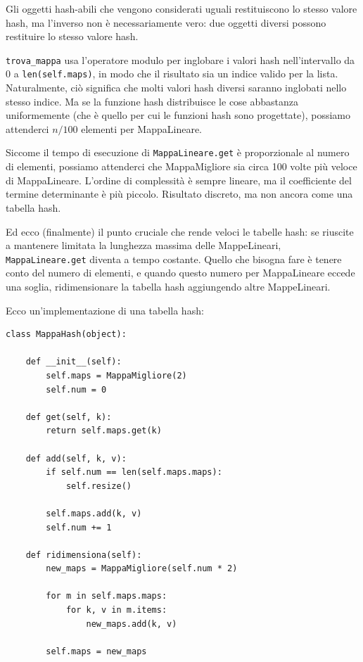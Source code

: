 \documentclass[10pt]{book}
\begin{document}
Gli oggetti hash-abili che vengono considerati uguali restituiscono lo stesso valore hash, ma l'inverso non è necessariamente vero: due oggetti diversi possono restituire lo stesso valore hash.

\verb"trova_mappa" usa l'operatore modulo per inglobare i valori hash nell'intervallo da 0 a {\tt len(self.maps)}, in modo che il risultato sia un indice valido per la lista. Naturalmente, ciò significa che molti valori hash diversi saranno inglobati nello stesso indice. Ma se la funzione hash distribuisce le cose abbastanza uniformemente (che è quello per cui le funzioni hash sono progettate), possiamo attenderci $n/100$ elementi per MappaLineare.

Siccome il tempo di esecuzione di {\tt MappaLineare.get} è proporzionale al numero di elementi, possiamo attenderci che MappaMigliore sia circa 100 volte più veloce di MappaLineare. L'ordine di complessità è sempre lineare, ma il coefficiente del termine determinante è più piccolo. Risultato discreto, ma non ancora come una tabella hash.

Ed ecco (finalmente) il punto cruciale che rende veloci le tabelle hash: se riuscite a mantenere limitata la lunghezza massima delle MappeLineari, {\tt
  MappaLineare.get} diventa a tempo costante.  Quello che bisogna fare è tenere conto del numero di elementi, e quando questo numero per MappaLineare eccede una soglia, ridimensionare la tabella hash aggiungendo altre MappeLineari.

Ecco un'implementazione di una tabella hash:

\begin{verbatim}
class MappaHash(object):

    def __init__(self):
        self.maps = MappaMigliore(2)
        self.num = 0

    def get(self, k):
        return self.maps.get(k)

    def add(self, k, v):
        if self.num == len(self.maps.maps):
            self.resize()

        self.maps.add(k, v)
        self.num += 1

    def ridimensiona(self):
        new_maps = MappaMigliore(self.num * 2)

        for m in self.maps.maps:
            for k, v in m.items:
                new_maps.add(k, v)

        self.maps = new_maps
\end{verbatim}
\end{document}
